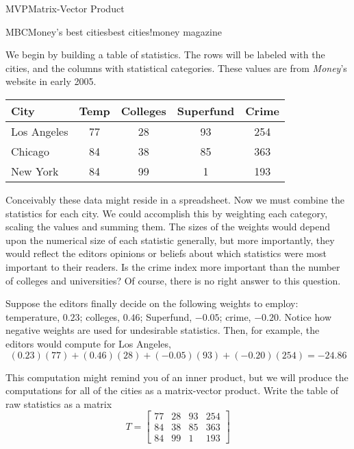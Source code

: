 \begin{subsect}{MVP}{Matrix-Vector Product}
\begin{example}{MBC}{Money's best cities}{best cities!money magazine}
%
\begin{para}We begin by building a table of statistics.  The rows will be labeled with the cities, and the columns with statistical categories.  These values are from {\sl Money}'s website in early 2005.
%
\begin{center}
\begin{tabular}{||l||c|c|c|c||}\hline
City & Temp & Colleges & Superfund & Crime\\\hline\hline
Los Angeles & 77 & 28 & 93 & 254\\\hline
Chicago & 84 & 38 & 85 & 363\\\hline
New York & 84 & 99 & 1 & 193\\\hline\hline
\end{tabular}
\end{center}
\end{para}
%
\begin{para}Conceivably these data might reside in a spreadsheet.  Now we must combine the statistics for each city.  We could accomplish this by weighting each category, scaling the values and summing them.  The sizes of the weights would depend upon the numerical size of each statistic generally, but more importantly, they would reflect the editors opinions or beliefs about which statistics were most important to their readers.  Is the crime index more important than the number of colleges and universities?  Of course, there is no right answer to this question.\end{para}
%
\begin{para}Suppose the editors finally decide on the following weights to employ:  temperature, $0.23$; colleges, $0.46$; Superfund, $-0.05$; crime, $-0.20$.  Notice how negative weights are used for undesirable statistics.  Then, for example, the editors would compute for Los Angeles,
%
\begin{equation*}
(0.23)(77) + (0.46)(28) + (-0.05)(93) + (-0.20)(254) = -24.86
\end{equation*}\end{para}
%
\begin{para}This computation might remind you of an inner product, but we will produce the computations for all of the cities as a matrix-vector product.  Write the table of raw statistics as a matrix
%
\begin{equation*}
T=
\begin{bmatrix}
77 & 28 & 93 & 254\\
84 & 38 & 85 & 363\\
84 & 99 & 1 & 193
\end{bmatrix}

\end{equation*}
\end{para}
\end{example}
\end{subsect}
